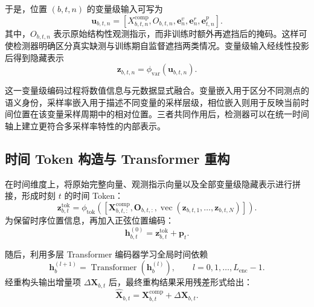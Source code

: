 \documentclass[bachelor, vlined]{DissertUESTC}
\begin{document}
    于是，位置 $(b,t,n)$ 的变量级输入可写为
    \begin{equation}
        \mathbf{u}_{b,t,n}
        =
        \left[
            X_{b,t,n}^{\mathrm{comp}},
            O_{b,t,n},
            \mathbf{e}_n^{v},
            \mathbf{e}_n^{r},
            \mathbf{e}_{t,n}^{p}
        \right].
    \end{equation}
    其中，$O_{b,t,n}$ 表示原始结构性观测指示，而非训练时额外再遮挡后的掩码。这样可使检测器明确区分真实缺测与训练期自监督遮挡两类情况。变量级输入经线性投影后得到隐藏表示
    \begin{equation}
        \mathbf{z}_{b,t,n} = \phi_{\mathrm{var}}(\mathbf{u}_{b,t,n}).
    \end{equation}
    
    这一变量级编码过程将数值信息与元数据显式融合。变量嵌入用于区分不同测点的语义身份，采样率嵌入用于描述不同变量的采样层级，相位嵌入则用于反映当前时间位置在该变量采样周期中的相对位置。三者共同作用后，检测器可以在统一时间轴上建立更符合多采样率特性的内部表示。
    
    \subsection{时间 Token 构造与 Transformer 重构}
    
    在时间维度上，将原始完整向量、观测指示向量以及全部变量级隐藏表示进行拼接，形成时刻 $t$ 的时间 Token：
    \begin{equation}
        \mathbf{z}_{b,t}^{\mathrm{tok}}
        =
        \phi_{\mathrm{tok}}
        \left(
            \left[
                \mathbf{X}_{b,t,:}^{\mathrm{comp}},
                \mathbf{O}_{b,t,:},
                \operatorname{vec}(\mathbf{z}_{b,t,1},\ldots,\mathbf{z}_{b,t,N})
            \right]
        \right).
    \end{equation}
    为保留时序位置信息，再加入正弦位置编码：
    \begin{equation}
        \mathbf{h}_{b,t}^{(0)} = \mathbf{z}_{b,t}^{\mathrm{tok}} + \mathbf{p}_t.
    \end{equation}
    
    随后，利用多层 Transformer 编码器学习全局时间依赖
    \begin{equation}
        \mathbf{h}_{b}^{(l+1)} = \operatorname{Transformer}\!\left(\mathbf{h}_{b}^{(l)}\right), \qquad l=0,1,\ldots,L_{\mathrm{enc}}-1.
    \end{equation}
    经重构头输出增量项 $\Delta \mathbf{X}_{b,t}$ 后，最终重构结果采用残差形式给出：
    \begin{equation}
        \hat{\mathbf{X}}_{b,t} = \mathbf{X}_{b,t}^{\mathrm{comp}} + \Delta \mathbf{X}_{b,t}.
    \end{equation}
    
\end{document}
